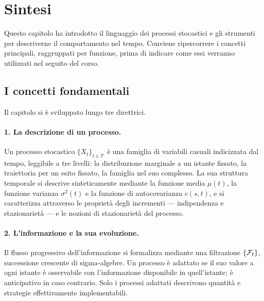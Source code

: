 %

\section{Sintesi}
\label{sec:sintesi-cap5}

\noindent
Questo capitolo ha introdotto il linguaggio dei processi stocastici e
gli strumenti per descriverne il comportamento nel tempo. Conviene
ripercorrere i concetti principali, raggruppati per funzione, prima di
indicare come essi verranno utilizzati nel seguito del corso.

\subsection{I concetti fondamentali}

\noindent
Il capitolo si \`{e} sviluppato lungo tre direttrici.

\paragraph{1. La descrizione di un processo.}
Un processo stocastico $\{X_t\}_{t\in\mathcal{T}}$ \`{e} una famiglia
di variabili casuali indicizzata dal tempo, leggibile a tre livelli:
la distribuzione marginale a un istante fissato, la traiettoria per un
esito fissato, la famiglia nel suo complesso. La sua struttura
temporale si descrive sinteticamente mediante la funzione media
$\mu(t)$, la funzione varianza $\sigma^2(t)$ e la funzione di
autocovarianza $c(s,t)$, e si caratterizza attraverso le propriet\`{a}
degli incrementi --- indipendenza e stazionariet\`{a} --- e le
nozioni di stazionariet\`{a} del processo.

\paragraph{2. L'informazione e la sua evoluzione.}
Il flusso progressivo dell'informazione si formalizza mediante una
filtrazione $\{\mathcal{F}_t\}$, successione crescente di sigma-algebre. Un
processo \`{e} adattato se il suo valore a ogni istante \`{e}
osservabile con l'informazione disponibile in quell'istante; \`{e}
anticipativo in caso contrario. Solo i processi adattati descrivono
quantit\`{a} e strategie effettivamente implementabili.

